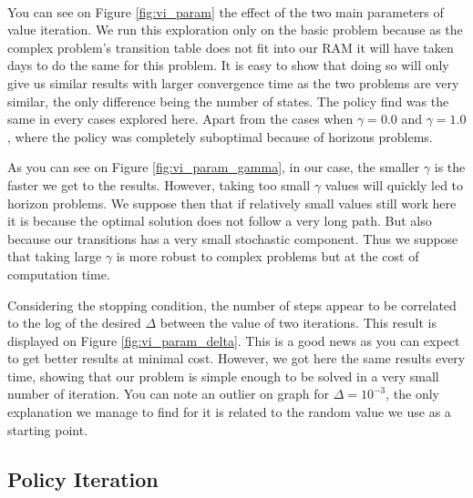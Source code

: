 \documentclass[twocolumn,a4paper,10pt]{article}
\begin{document}
\paragraph{}

You can see on Figure \ref{fig:vi_param} the effect of the two main
parameters of value iteration. We run this exploration only on the
basic problem because as the complex problem's transition table does
not fit into our RAM it will have taken days to do the same for this
problem. It is easy to show that doing so will only give us similar
results with larger convergence time as the two problems are very
similar, the only difference being the number of states. The policy
find was the same in every cases explored here. Apart from the cases
when $\gamma=0.0$ and $\gamma=1.0$, where the policy was completely
suboptimal because of horizons problems.

As you can see on Figure \ref{fig:vi_param_gamma}, in our case, the
smaller $\gamma$ is the faster we get to the results. However, taking
too small $\gamma$ values will quickly led to horizon problems. We
suppose then that if relatively small values still work here it is
because the optimal solution does not follow a very long path. But
also because our transitions has a very small stochastic component.
Thus we suppose that taking large $\gamma$ is more robust to complex
problems but at the cost of computation time.

Considering the stopping condition, the number of steps appear to be
correlated to the log of the desired $\Delta$ between the value of
two iterations. This result is displayed on Figure \ref{fig:vi_param_delta}.
This is a good news as you can expect to get better results at minimal
cost. However, we got here the same results every time, showing that
our problem is simple enough to be solved in a very small number of
iteration. You can note an outlier on graph for $\Delta=10^{-3}$,
the only explanation we manage to find for it is related to the random
value we use as a starting point.

\subsection{Policy Iteration}

\label{pi} 

\paragraph{}
\end{document}
